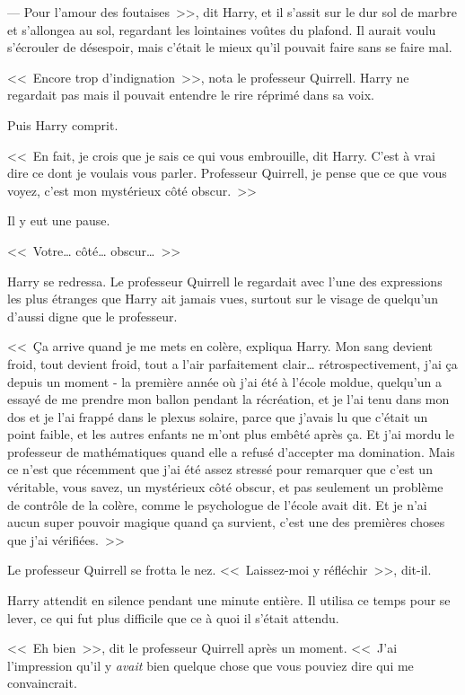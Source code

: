 --- Pour l'amour des foutaises~>>, dit Harry, et il s'assit sur le dur sol de marbre et s'allongea au sol, regardant les lointaines voûtes du plafond. Il aurait voulu s'écrouler de désespoir, mais c'était le mieux qu'il pouvait faire sans se faire mal.

<<~Encore trop d'indignation~>>, nota le professeur Quirrell. Harry ne regardait pas mais il pouvait entendre le rire réprimé dans sa voix.

Puis Harry comprit.

<<~En fait, je crois que je sais ce qui vous embrouille, dit Harry. C'est à vrai dire ce dont je voulais vous parler. Professeur Quirrell, je pense que ce que vous voyez, c'est mon mystérieux côté obscur.~>>

Il y eut une pause.

<<~Votre… côté… obscur…~>>

Harry se redressa. Le professeur Quirrell le regardait avec l'une des expressions les plus étranges que Harry ait jamais vues, surtout sur le visage de quelqu'un d'aussi digne que le professeur.

<<~Ça arrive quand je me mets en colère, expliqua Harry. Mon sang devient froid, tout devient froid, tout a l'air parfaitement clair… rétrospectivement, j'ai ça depuis un moment - la première année où j'ai été à l'école moldue, quelqu'un a essayé de me prendre mon ballon pendant la récréation, et je l'ai tenu dans mon dos et je l'ai frappé dans le plexus solaire, parce que j'avais lu que c'était un point faible, et les autres enfants ne m'ont plus embêté après ça. Et j'ai mordu le professeur de mathématiques quand elle a refusé d'accepter ma domination. Mais ce n'est que récemment que j'ai été assez stressé pour remarquer que c'est un véritable, vous savez, un mystérieux côté obscur, et pas seulement un problème de contrôle de la colère, comme le psychologue de l'école avait dit. Et je n'ai aucun super pouvoir magique quand ça survient, c'est une des premières choses que j'ai vérifiées.~>>

Le professeur Quirrell se frotta le nez. <<~Laissez-moi y réfléchir~>>, dit-il.

Harry attendit en silence pendant une minute entière. Il utilisa ce temps pour se lever, ce qui fut plus difficile que ce à quoi il s'était attendu.

<<~Eh bien~>>, dit le professeur Quirrell après un moment. <<~J'ai l'impression qu'il y \emph{avait} bien quelque chose que vous pouviez dire qui me convaincrait.

